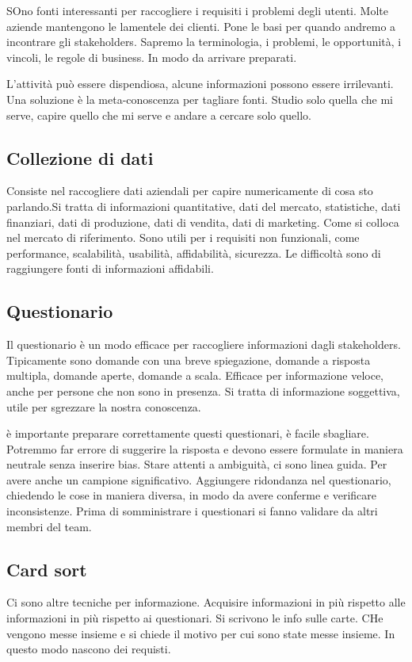 \documentclass[oneside,a4paper,11pt]{book}
\theoremstyle{italicstyle}
\theoremstyle{normStyle}
\begin{document}
SOno fonti interessanti per raccogliere i requisiti i problemi degli utenti. Molte 
aziende mantengono le lamentele dei clienti. Pone le basi per quando 
andremo a incontrare gli stakeholders. Sapremo la terminologia, i problemi,
le opportunità, i vincoli, le regole di business. In modo da arrivare preparati.

L'attività può essere dispendiosa, alcune informazioni possono essere irrilevanti.
Una soluzione è la meta-conoscenza per tagliare fonti.
Studio solo quella che mi serve, capire quello che mi serve e andare a cercare
solo quello.
\subsection{Collezione di dati}
Consiste nel raccogliere dati aziendali per capire numericamente di cosa sto 
parlando.Si tratta di informazioni quantitative, dati del mercato, statistiche,
dati finanziari, dati di produzione, dati di vendita, dati di marketing.
Come si colloca nel mercato di riferimento.
Sono utili per i requisiti non funzionali, come performance, scalabilità,
usabilità, affidabilità, sicurezza.
Le difficoltà sono di raggiungere fonti di informazioni affidabili.
\subsection{Questionario}
Il questionario è un modo efficace per raccogliere informazioni dagli stakeholders.
Tipicamente sono domande con una breve spiegazione, domande a risposta multipla,
domande aperte, domande a scala. Efficace per informazione veloce, anche per 
persone che non sono in presenza. Si tratta di informazione soggettiva, utile per 
sgrezzare la nostra conoscenza.

è importante preparare correttamente questi questionari, è facile sbagliare. 
Potremmo far errore di suggerire la risposta e devono essere formulate 
in maniera neutrale senza inserire bias.
Stare attenti a ambiguità, ci sono linea guida. Per avere anche un campione 
significativo.
Aggiungere ridondanza nel questionario, chiedendo le cose in maniera diversa, 
in modo da avere conferme e verificare inconsistenze.
Prima di somministrare i questionari si fanno validare da altri membri del team.

\subsection{Card sort}
Ci sono altre tecniche per informazione.
Acquisire informazioni in più rispetto alle informazioni in più rispetto
ai questionari. Si scrivono le info sulle carte. CHe vengono messe insieme 
e si chiede il motivo per cui sono state messe insieme. In questo modo 
nascono dei requisti.
\end{document}
